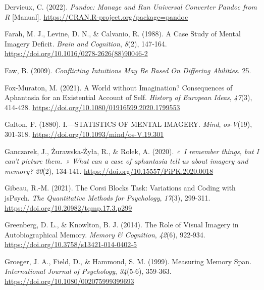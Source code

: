 \documentclass[
  12pt,
]{article}
\newlength{\cslhangindent}
\newlength{\cslentryspacingunit} %
\newenvironment{CSLReferences}[2] %
 {%
  \setlength{\parindent}{0pt}
  \ifodd #1
  \let\oldpar\par
  \def\par{\hangindent=\cslhangindent\oldpar}
  \fi
  \setlength{\parskip}{#2\cslentryspacingunit}
 }%
 {}
\begin{document}
\begin{CSLReferences}{1}{0}
\leavevmode{}%
Dervieux, C. (2022). \emph{Pandoc: {Manage} and Run Universal Converter
Pandoc from {R}} {[}Manual{]}.
\url{https://CRAN.R-project.org/package=pandoc}

\leavevmode{}%
Farah, M. J., Levine, D. N., \& Calvanio, R. (1988). A Case Study of
Mental Imagery Deficit. \emph{Brain and Cognition}, \emph{8}(2),
147‑164. \url{https://doi.org/10.1016/0278-2626(88)90046-2}

\leavevmode{}%
Faw, B. (2009). \emph{Conflicting {Intuitions May Be Based On Differing
Abilities}}. 25.

\leavevmode{}%
Fox-Muraton, M. (2021). A World without Imagination? {Consequences} of
Aphantasia for an Existential Account of Self. \emph{History of European
Ideas}, \emph{47}(3), 414‑428.
\url{https://doi.org/10.1080/01916599.2020.1799553}

\leavevmode{}%
Galton, F. (1880). I.---{STATISTICS OF MENTAL IMAGERY}. \emph{Mind},
\emph{os-V}(19), 301‑318. \url{https://doi.org/10.1093/mind/os-V.19.301}

\leavevmode{}%
Ganczarek, J., Żurawska-Żyła, R., \& Rolek, A. (2020). \emph{{«~I
remember things, but I can't picture them.~»} What can a case of
aphantasia tell us about imagery and memory?} \emph{20}(2), 134‑141.
\url{https://doi.org/10.15557/PiPK.2020.0018}

\leavevmode{}%
Gibeau, R.-M. (2021). The {Corsi Blocks Task}: {Variations} and Coding
with {jsPsych}. \emph{The Quantitative Methods for Psychology},
\emph{17}(3), 299‑311. \url{https://doi.org/10.20982/tqmp.17.3.p299}

\leavevmode{}%
Greenberg, D. L., \& Knowlton, B. J. (2014). The Role of Visual Imagery
in Autobiographical Memory. \emph{Memory \& Cognition}, \emph{42}(6),
922‑934. \url{https://doi.org/10.3758/s13421-014-0402-5}

\leavevmode{}%
Groeger, J. A., Field, D., \& Hammond, S. M. (1999). Measuring Memory
Span. \emph{International Journal of Psychology}, \emph{34}(5-6),
359‑363. \url{https://doi.org/10.1080/002075999399693}


\end{CSLReferences}
\end{document}
